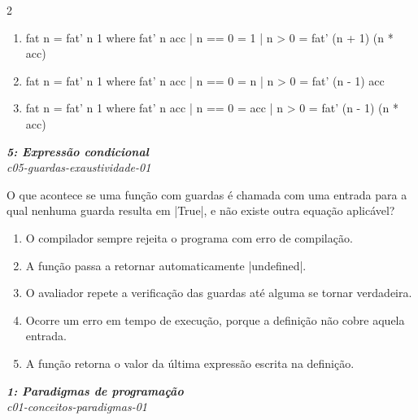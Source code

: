 \documentclass[a4paper,10pt,brazil]{article}
\begin{document}
\begin{multicols}{2}
\begin{enumerate}
  \item \begin{haskellcode}
fat n = fat' n 1
  where
    fat' n acc
      | n == 0 = 1
      | n > 0  = fat' (n + 1) (n * acc)
\end{haskellcode}

  \item \begin{haskellcode}
fat n = fat' n 1
  where
    fat' n acc
      | n == 0 = n
      | n > 0  = fat' (n - 1) acc
\end{haskellcode}

  \item \begin{haskellcode}
fat n = fat' n 1
  where
    fat' n acc
      | n == 0 = acc
      | n > 0  = fat' (n - 1) (n * acc)
\end{haskellcode}


\end{enumerate}

\begin{flushright}
  \footnotesize
  \textit{\textbf{5: Expressão condicional}}\\
  \textit{c05-guardas-exaustividade-01}\\

\end{flushright}
O que acontece se uma função com guardas é chamada com uma entrada para a qual nenhuma guarda resulta em \haskellinline|True|, e não existe outra equação aplicável?

\begin{enumerate}
  \item O compilador sempre rejeita o programa com erro de compilação.

  \item A função passa a retornar automaticamente \haskellinline|undefined|.

  \item O avaliador repete a verificação das guardas até alguma se tornar verdadeira.

  \item Ocorre um erro em tempo de execução, porque a definição não cobre aquela entrada.

  \item A função retorna o valor da última expressão escrita na definição.


\end{enumerate}

\begin{flushright}
  \footnotesize
  \textit{\textbf{1: Paradigmas de programação}}\\
  \textit{c01-conceitos-paradigmas-01}\\


\end{flushright}
\end{multicols}
\end{document}
